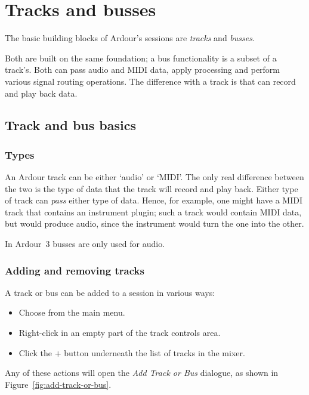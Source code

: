 \documentclass[10pt,a4paper]{book}
\newcommand{\menu}[1]{\emph{\StrSubstitute{#1}{,}{ $\rightarrow$ }}}
\begin{document}
{\chapter{Tracks and busses}
\label{ch:tracks-and-busses}

The basic building blocks of Ardour's sessions are \emph{tracks}
and \emph{busses}.

Both are built on the same foundation; a bus functionality is a
subset of a track's.  Both can pass audio and MIDI data, apply
processing and perform various signal routing operations.  The
difference with a track is that can record and play back data.

\section{Track and bus basics}

\subsection{Types}

An Ardour track can be either `audio' or `MIDI'.  The only real
difference between the two is the type of data that the track will
record and play back.  Either type of track can \emph{pass} either
type of data.  Hence, for example, one might have a MIDI track that
contains an instrument plugin; such a track would contain MIDI data,
but would produce audio, since the instrument would turn the one into
the other.

In Ardour~3 busses are only used for audio.

\subsection{Adding and removing tracks}

A track or bus can be added to a session in various ways:

\begin{itemize}
\item Choose \menu{Track,Add Track or Bus\ldots} from the main menu.
\item Right-click in an empty part of the track controls area.
\item Click the $+$ button underneath the list of tracks in the mixer.
\end{itemize}

Any of these actions will open the \emph{Add Track or Bus} dialogue,
as shown in Figure~\ref{fig:add-track-or-bus}.

}
\end{document}

